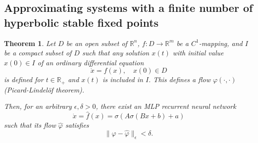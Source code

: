 \documentclass{article}
\newtheorem{theorem}{Theorem}
\theoremstyle{definition}
\theoremstyle{remark}
\newcommand{\reals}{\mathbb{R}}
\newcounter{ct}
\begin{document}




\subsection{Approximating systems with a finite number of hyperbolic stable fixed points}

\begin{theorem}\label{thrm:approx}
Let $D$ be an open subset of $\mathbb{R}^n$,
 $f\colon D \to \mathbb{R}^m$ be a $C^1$-mapping,
  and $I$ be a compact subset of $D$ such that any solution $x(t)$ with initial value $x(0) \in I$ of an ordinary differential equation
\begin{equation}\label{eq:5}
    \dot{x} = f(x), \quad x(0) \in D
\end{equation}
is defined for $t\in\reals_{+}$ and $x(t)$ is included in $I$.
This defines a flow $\varphi(\cdot, \cdot)$ (Picard-Lindel\"of theorem).

Then, for an arbitrary $\epsilon, \delta > 0$, there exist an MLP recurrent neural network 
 \begin{equation}
\dot x = \hat f(x) = \sigma(A\sigma(Bx+b)+a)
\end{equation}
such that its flow $\hat \varphi$ satisfies
\begin{equation}
\|\varphi-\hat \varphi\|_\epsilon < \delta.
\end{equation}
\end{theorem}

\end{document}
